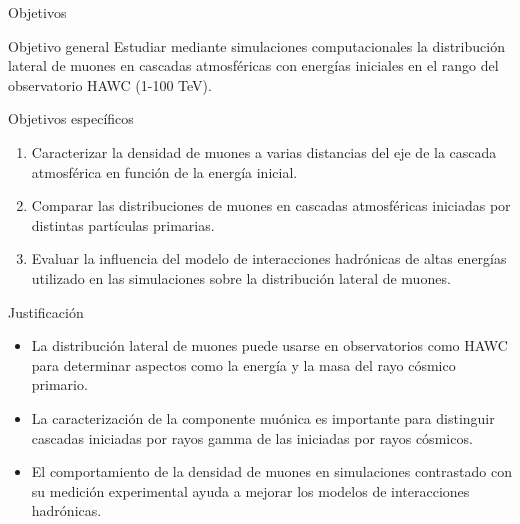 \documentclass[10pt,xcolor=table]{beamer}
\begin{document}
\begin{frame}{Objetivos}
	\begin{block}{Objetivo general}
	Estudiar mediante simulaciones computacionales la distribución lateral de muones en cascadas atmosféricas con energías iniciales en el rango del observatorio HAWC (1-100 TeV).
	\end{block}
	\vspace{0.3 cm}
	\begin{block}{Objetivos espec\'ificos}
		\begin{enumerate}
		\item Caracterizar la densidad de muones a varias distancias del eje de la cascada atmosf\'erica en funci\'on de la energ\'ia inicial. \vspace{0.1 cm}
		\item Comparar las distribuciones de muones en cascadas atmosf\'ericas iniciadas por distintas part\'iculas primarias. \vspace{0.1 cm}
		\item Evaluar la influencia del modelo de interacciones hadr\'onicas de altas energ\'ias utilizado en las simulaciones sobre la distribuci\'on lateral de muones. \vspace{0.1 cm}
		\end{enumerate}
	\end{block}
\end{frame}

\begin{frame}{Justificaci\'on}
\vspace{\fill}
	\begin{itemize}
	\item La distribuci\'on lateral de muones puede usarse en observatorios como HAWC para determinar aspectos como la energ\'ia y la masa del rayo c\'osmico primario. \vspace{0.3 cm}
	\item La caracterizaci\'on de la componente mu\'onica es importante para distinguir cascadas iniciadas por rayos gamma de las iniciadas por rayos c\'osmicos.\vspace{0.3 cm}
	\item El comportamiento de la densidad de muones en simulaciones contrastado con su medici\'on experimental ayuda a mejorar los modelos de interacciones hadr\'onicas. 
	\end{itemize}
\vspace{\fill}
\end{frame}
\end{document}
